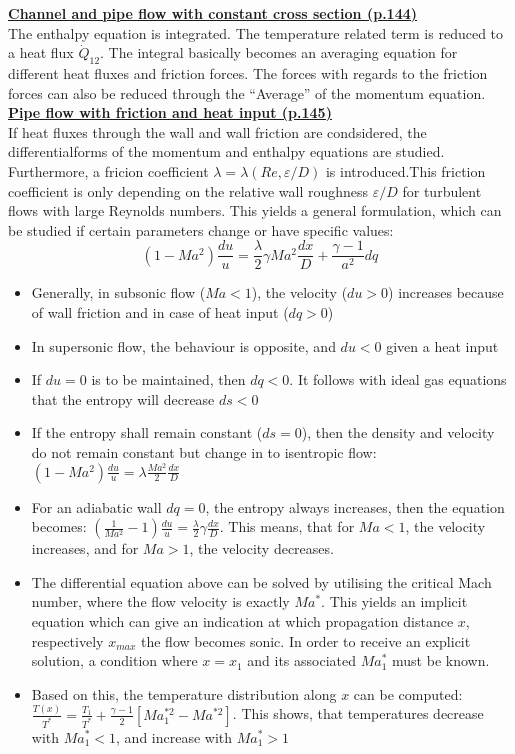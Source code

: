 \documentclass[8pt, landscape, fleqn]{scrartcl}
\begin{document}
\begin{multicols*}{3}
\underline{\textbf{Channel and pipe flow with constant cross section (p.144)}}\\
The enthalpy equation is integrated. The temperature related term is reduced to a heat flux $\dot{Q}_{12}$. The integral basically becomes an averaging equation for different heat fluxes and friction forces. The forces with regards to the friction forces can also be reduced through the ``Average'' of the momentum equation. \\

\underline{\textbf{Pipe flow with friction and heat input (p.145)}} \\
If heat fluxes through the wall and wall friction are condsidered, the differentialforms of the momentum and enthalpy equations are studied. Furthermore, a fricion coefficient $\lambda = \lambda(Re, \varepsilon/D)$ is introduced.This friction coefficient is only depending on the relative wall roughness $\varepsilon/D$ for turbulent flows with large Reynolds numbers. This yields a general formulation, which can be studied if certain parameters change or have specific values:
\begin{equation*}
    (1-Ma^2)\frac{du}{u} = \frac{\lambda}{2}\gamma Ma^2 \frac{dx}{D} + \frac{\gamma-1}{a^2} dq
\end{equation*}
\begin{itemize}
    \item Generally, in subsonic flow ($Ma < 1$), the velocity ($du > 0$) increases because of wall friction and in case of heat input ($dq > 0$) 
    \item In supersonic flow, the behaviour is opposite, and $du < 0$ given a heat input
    \item If $du = 0$ is to be maintained, then $dq < 0$. It follows with ideal gas equations that the entropy will decrease $ds < 0$
    \item If the entropy shall remain constant ($ds = 0$), then the density and velocity do not remain constant but change in to isentropic flow: $(1-Ma^2)\frac{du}{u}=\lambda \frac{Ma^2}{2}\frac{dx}{D}$ 
    \item For an adiabatic wall $dq=0$, the entropy always increases, then the equation becomes: $\left( \frac{1}{Ma^2}-1 \right)\frac{du}{u} = \frac{\lambda}{2}\gamma \frac{dx}{D}$. This means, that for $Ma <1$, the velocity increases, and for $Ma > 1$, the velocity decreases. 
    \item The differential equation above can be solved by utilising the critical Mach number, where the flow velocity is exactly $Ma^*$. This yields an implicit equation which can give an indication at which propagation distance $x$, respectively $x_{max}$ the flow becomes sonic. In order to receive an explicit solution, a condition where $x=x_1$ and its associated $Ma_1^*$ must be known.
    \item Based on this, the temperature distribution along $x$ can be computed: $\frac{T(x)}{T^*} = \frac{T_1}{T^*} + \frac{\gamma-1}{2}\left[Ma_1^{*2}-Ma^{*2}\right]$. This shows, that temperatures decrease with $Ma_1^* < 1$, and increase with $Ma_1^* > 1$
\end{itemize}


\end{multicols*}
\end{document}
